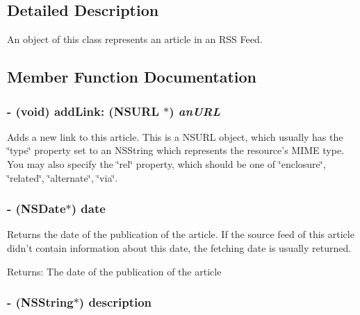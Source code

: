 \subsection{Detailed Description}
An object of this class represents an article in an RSS Feed. 



\subsection{Member Function Documentation}
\subsubsection{\setlength{\rightskip}{0pt plus 5cm}- (void) add\-Link: (NSURL $\ast$) {\em an\-URL}}\label{interfaceRSSArticle_739a84b52475f06f053778bebf925fb7}


Adds a new link to this article. This is a NSURL object, which usually has the \char`\"{}type\char`\"{} property set to an NSString which represents the resource's MIME type. You may also specify the \char`\"{}rel\char`\"{} property, which should be one of \char`\"{}enclosure\char`\"{}, \char`\"{}related\char`\"{}, \char`\"{}alternate\char`\"{}, \char`\"{}via\char`\"{}. 
\subsubsection{\setlength{\rightskip}{0pt plus 5cm}- (NSDate$\ast$) date }\label{interfaceRSSArticle_4b4aae899bd76df47234b07f3add2095}


Returns the date of the publication of the article. If the source feed of this article didn't contain information about this date, the fetching date is usually returned.

\begin{Desc}
\item[Returns:]The date of the publication of the article \end{Desc}
\subsubsection{\setlength{\rightskip}{0pt plus 5cm}- (NSString$\ast$) description }\label{interfaceRSSArticle_4288085868ea28184f9cfc6851d2c67a}


